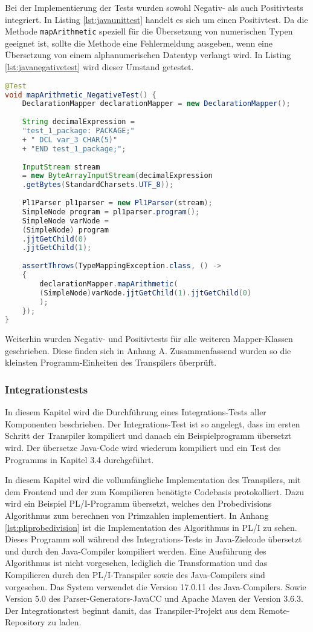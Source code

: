 Bei der Implementierung der Tests wurden sowohl Negativ- als auch Positivtests integriert.
In Listing \ref{lst:javaunittest} handelt es sich um einen Positivtest. Da die Methode \verb+mapArithmetic+ speziell für die Übersetzung von numerischen Typen geeignet ist, sollte die Methode eine Fehlermeldung ausgeben, wenn eine Übersetzung von einem alphanumerischen Datentyp verlangt wird.  In Listing \ref{lst:javanegativetest} wird dieser Umstand getestet. 

\begin{lstlisting}[language=Java, caption=Negativtest für die Übersetzung eines arithmetischen Ausdrucks, label={lst:javanegativetest}]
@Test
void mapArithmetic_NegativeTest() {
	DeclarationMapper declarationMapper = new DeclarationMapper();
	
	String decimalExpression = 
	"test_1_package: PACKAGE;" 
	+ "	DCL var_3 CHAR(5)" 
	+ "END test_1_package;";
	
	InputStream stream
	= new ByteArrayInputStream(decimalExpression
	.getBytes(StandardCharsets.UTF_8));
		
	Pl1Parser pl1parser = new Pl1Parser(stream);
	SimpleNode program = pl1parser.program();
	SimpleNode varNode = 
	(SimpleNode) program
	.jjtGetChild(0)
	.jjtGetChild(1);
		
	assertThrows(TypeMappingException.class, () -> 
	{
		declarationMapper.mapArithmetic(
		(SimpleNode)varNode.jjtGetChild(1).jjtGetChild(0)
		);
	});
}
\end{lstlisting}

Weiterhin wurden Negativ- und Positivtests für alle weiteren Mapper-Klassen geschrieben. Diese finden sich in Anhang A.
Zusammenfassend wurden so die kleinsten Programm-Einheiten des Transpilers überprüft. 


\subsubsection{Integrationstests}
In diesem Kapitel wird die Durchführung eines Integrations-Tests aller Komponenten beschrieben. Der Integrations-Test ist so angelegt, dass im ersten Schritt der Transpiler kompiliert und danach ein Beispielprogramm übersetzt wird. Der übersetze Java-Code wird wiederum kompiliert und ein Test des Programms in Kapitel 3.4 durchgeführt.

In diesem Kapitel wird die vollumfängliche Implementation des Transpilers, mit dem Frontend und der zum Kompilieren benötigte Codebasis protokolliert. Dazu wird ein Beispiel PL/I-Programm übersetzt, welches den Probedivisions Algorithmus zum berechnen von Primzahlen implementiert. 
In Anhang \ref{lst:pliprobedivision} ist die Implementation des Algorithmus in PL/I zu sehen. Dieses Programm soll während des Integrations-Tests in Java-Zielcode übersetzt und durch den Java-Compiler kompiliert werden.
Eine Ausführung des Algorithmus ist nicht vorgesehen, lediglich die Transformation und das Kompilieren durch den PL/I-Transpiler sowie des Java-Compilers sind vorgesehen. Das System verwendet die Version 17.0.11 des Java-Compilers. Sowie Version 5.0 des Parser-Generators-JavaCC und Apache Maven der Version 3.6.3. Der Integrationstest beginnt damit, das Transpiler-Projekt aus dem Remote-Repository zu laden.

